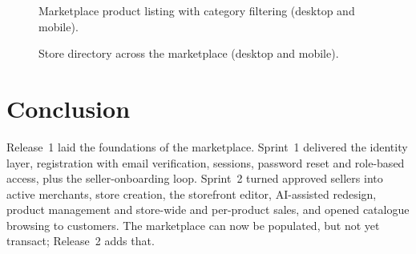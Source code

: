 \begin{figure}[H]
  \centering
  \caption{Marketplace product listing with category filtering (desktop and mobile).}
  \label{fig:real-allproducts}
\end{figure}

\begin{figure}[H]
  \centering
  \caption{Store directory across the marketplace (desktop and mobile).}
  \label{fig:real-allstores}
\end{figure}

\section*{Conclusion}

Release~1 laid the foundations of the marketplace. Sprint~1 delivered the
identity layer, registration with email verification, sessions, password
reset and role-based access, plus the seller-onboarding loop. Sprint~2
turned approved sellers into active merchants, store creation, the
storefront editor, AI-assisted redesign, product management and
store-wide and per-product sales, and opened catalogue browsing to
customers. The
marketplace can now be populated, but not yet transact; Release~2 adds
that.

